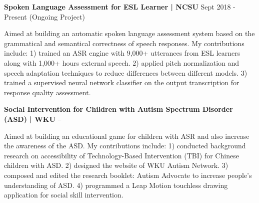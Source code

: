 \documentclass[letterpaper,MMMyyyy,nonstopmode]{simpleresumecv}
\begin{document}
\begin{Body}
    \Gap
    \Entry
    \textbf{Spoken Language Assessment for ESL Learner | NCSU} \hfill Sept 2018 - Present (Ongoing  Project)
    \begin{Detail}
        \BulletItem
        Aimed at building an automatic spoken language assessment system based on the grammatical and semantical correctness of speech responses.
        \BulletItem
        My contributions include: 
        1) trained an ASR engine with 9,000+ utterances from ESL learners along with 1,000+ hours external speech.
        2) applied pitch normalization and speech adaptation techniques to reduce differences between different models.
        3) trained a supervised neural network classifier on the output transcription for response quality assessment.
    \end{Detail}
    
    
    \Gap
    \Entry
    \textbf{Social Intervention for Children with Autism Spectrum Disorder (ASD) | WKU } \hfill {} --
    \begin{Detail}
        \BulletItem
        Aimed at building an educational game for children with ASR and also increase the awareness of the ASD.
        \BulletItem
        My contributions include: 1) conducted background research on accessibility of Technology-Based Intervention (TBI) for Chinese children with ASD.
        2) designed the website of WKU Autism Network.
        3) composed and edited the research booklet: Autism Advocate to increase people's understanding of ASD.
        4) programmed a Leap Motion touchless drawing application for social skill intervention.
    \end{Detail}
    
    
    

\end{Body}
\end{document}
